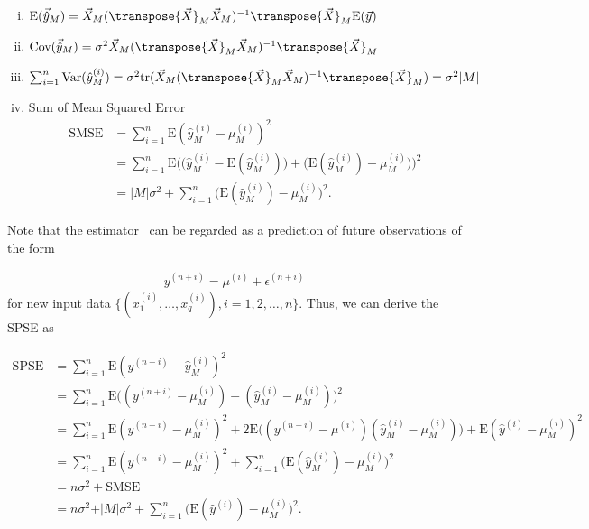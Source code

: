 \begin{enumerate}[(i)]%
	\item $\text{E} (\vec{\hat{y}}_M) = \vec{X}_M (\transpose{\vec{X}}_M \vec{X}_M)^{-1}\transpose{\vec{X}}_M \text{E}(\vec{y})$
	\item $\text{Cov} (\vec{\hat{y}}_M) = \sigma^2 \vec{X}_M (\transpose{\vec{X}}_M \vec{X}_M)^{-1}\transpose{\vec{X}}_M$
	\item $\sum_{i=1}^n \text{Var}(\hat y^{(i)}_M) = \sigma^2 \text{tr}(\vec{X}_M (\transpose{\vec{X}}_M \vec{X}_M)^{-1} \transpose{\vec{X}}_M) = \sigma^2 \vert M \vert $
	\item Sum of Mean Squared Error
		\begin{equation}  
		\begin{split} 
		\text{SMSE} &= \sum_{i=1}^n \text{E}(\hat y^{(i)}_M - \mu^{(i)}_M)^2 \\
				    &= \sum_{i=1}^n \text{E}\Big( \big( \hat y^{(i)}_M - \text{E}(\hat y^{(i)}_M) \big) + \big(\text{E}(\hat y^{(i)}_M) - \mu^{(i)}_M \big) \Big)^2 \\
				    &= \vert M \vert\sigma^2 + \sum_{i=1}^n \big( \text{E}(\hat y^{(i)}_M) - \mu^{(i)}_M \big)^2.
		\end{split}
		\end{equation}
\end{enumerate}

Note that the estimator~ can be regarded as a prediction of future observations of the form

\begin{align}
	y^{(n+i)} = \mu^{(i)} + \epsilon^{(n+i)}
\end{align}
%
for new input data $\{(x_1^{(i)}, \dots, x_q^{(i)}), i=1,2,\dots,n\}$. Thus, we can derive the SPSE as

\begin{equation}
\begin{split}
	\text{SPSE} &= \sum_{i=1}^{n} \text{E}(y^{(n+i)} - \hat y^{(i)}_M)^2 \\ 
				&= \sum_{i=1}^{n} \text{E}\big((y^{(n+i)} - \mu^{(i)}_M) - (\hat y^{(i)}_M - \mu^{(i)}_M)\big)^2 \\ 
				&= \sum_{i=1}^{n} \text{E}(y^{(n+i)} - \mu^{(i)}_M)^2 + 2\text{E} \big( (y^{(n+i)} - \mu^{(i)})(\hat y^{(i)}_M - \mu^{(i)}_M) \big) + \text{E}(\hat y^{(i)} - \mu^{(i)}_M)^2 \\
				&= \sum_{i=1}^{n}\text{E}(y^{(n+i)} - \mu^{(i)}_M)^2 + \sum_{i=1}^{n} \big(\text{E}(\hat y^{(i)}_M) - \mu^{(i)}_M \big)^2 \\ 
				&= n\sigma^2 + \text{SMSE} \\ 
				&= n\sigma^2 + \vert M \vert \sigma^2 + \sum_{i=1}^{n} \big(\text{E}(\hat y^{(i)}) - \mu^{(i)}_M \big)^2.
\end{split}
\end{equation}

